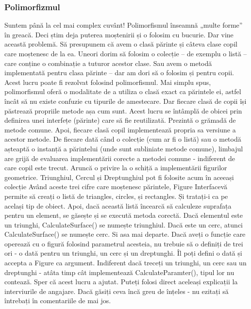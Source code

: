 \subsubsection{ Polimorfizmul }
Suntem până la cel mai complex cuvânt! Polimorfismul înseamnă „multe forme” în
greacă. Deci știm deja puterea moștenirii și o folosim cu bucurie. Dar vine
această problemă. Să presupunem că avem o clasă părinte și câteva clase copil
care moștenesc de la ea. Uneori dorim să folosim o colecție – de exemplu o
listă – care conține o combinație a tuturor acestor clase. Sau avem o metodă
implementată pentru clasa părinte – dar am dori să o folosim și pentru copii.
Acest lucru poate fi rezolvat folosind polimorfismul. Mai simplu spus,
polimorfismul oferă o modalitate de a utiliza o clasă exact ca părintele ei,
astfel încât să nu existe confuzie cu tipurile de amestecare. Dar fiecare clasă
de copii își păstrează propriile metode așa cum sunt. Acest lucru se întâmplă
de obicei prin definirea unei interfețe (părinte) care să fie reutilizată.
Prezintă o grămadă de metode comune. Apoi, fiecare clasă copil implementează
propria sa versiune a acestor metode. De fiecare dată când o colecție (cum ar
fi o listă) sau o metodă așteaptă o instanță a părintelui (unde sunt subliniate
metode comune), limbajul are grijă de evaluarea implementării corecte a metodei
comune - indiferent de care copil este trecut. Aruncă o privire la o schiță a
implementării figurilor geometrice.  Triunghiul, Cercul și Dreptunghiul pot fi
folosite acum în aceeași colecție Având aceste trei cifre care moștenesc
părintele, Figure Interfacevă permite să creați o listă de triangles, circles,
și rectangles. Și tratați-i ca pe același tip de obiect. Apoi, dacă această
listă încearcă să calculeze suprafața pentru un element, se găsește și se
execută metoda corectă. Dacă elementul este un triunghi, CalculateSurface() se
numește triunghiul. Dacă este un cerc, atunci CalculateSurface() se numește
cerc. Si asa mai departe. Dacă aveți o funcție care operează cu o figură
folosind parametrul acesteia, nu trebuie să o definiți de trei ori - o dată
pentru un triunghi, un cerc și un dreptunghi. Îl poți defini o dată și accepta
a Figure ca argument. Indiferent dacă treceți un triunghi, un cerc sau un
dreptunghi - atâta timp cât implementează CalculateParamter(), tipul lor nu
contează. Sper că acest lucru a ajutat. Puteți folosi direct aceleași
explicații la interviurile de angajare. Dacă găsiți ceva încă greu de înțeles -
nu ezitați să întrebați în comentariile de mai jos.
